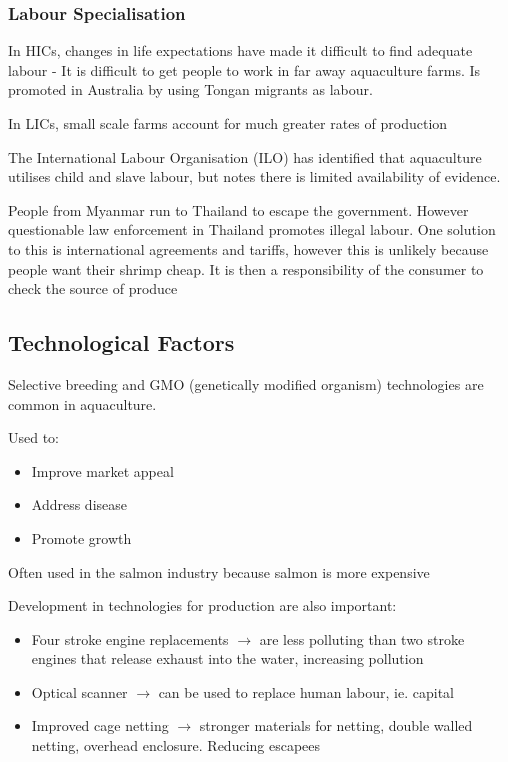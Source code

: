 			\subsubsection{Labour Specialisation}
				In HICs, changes in life expectations have made it difficult to find adequate labour - It is difficult to get people to work in far away aquaculture farms. Is promoted in Australia by using Tongan migrants as labour.

				In LICs, small scale farms account for much greater rates of production

				The International Labour Organisation (ILO) has identified that aquaculture utilises child and slave labour, but notes there is limited availability of evidence.

				People from Myanmar run to Thailand to escape the government. However questionable law enforcement in Thailand promotes illegal labour.
				One solution to this is international agreements and tariffs, however this is unlikely because people want their shrimp cheap. It is then a responsibility of the consumer to check the source of produce

		\subsection{Technological Factors} \label{11/11/2024}
			Selective breeding and GMO (genetically modified organism) technologies are common in aquaculture.

			Used to:
			\begin{itemize}
				\item Improve market appeal
				\item Address disease
				\item Promote growth
			\end{itemize}

			Often used in the salmon industry because salmon is more expensive

			Development in technologies for production are also important:
			\begin{itemize}
				\item Four stroke engine replacements $\rightarrow$ are less polluting than two stroke engines that release exhaust into the water, increasing pollution
				\item Optical scanner $\rightarrow$ can be used to replace human labour, ie. capital
				\item Improved cage netting $\rightarrow$ stronger materials for netting, double walled netting, overhead enclosure. Reducing escapees
			\end{itemize}

